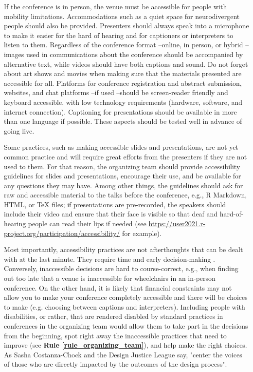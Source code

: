 \documentclass[10pt,letterpaper]{article}
\begin{document}
If the conference is in person, the venue must be accessible for people with mobility limitations. 
Accommodations such as a quiet space for neurodivergent people should also be provided.
Presenters should always speak into a microphone to make it easier for the hard of hearing and for captioners or interpreters to listen to them. 
Regardless of the conference format --online, in person, or hybrid --images used in communications about the conference should be accompanied by alternative text, while videos should have both captions and sound. Do not forget about art shows and movies when making sure that the materials presented are accessible for all. 
Platforms for conference registration and abstract submission, websites, and chat platforms --if used --should be screen-reader friendly and keyboard accessible, with low technology requirements (hardware, software, and internet connection). 
Captioning for presentations should be available in more than one language if possible.
These aspects should be tested well in advance of going live.  

Some practices, such as making accessible slides and presentations, are not yet common practice and will require great efforts from the presenters if they are not used to them. 
For that reason, the organizing team should provide accessibility guidelines for slides and presentations, encourage their use, and be available for any questions they may have.  
Among other things, the guidelines should ask for raw and accessible material to the talks before the conference, e.g., R Markdown, HTML, or \TeX{} files; if presentations are pre-recorded, the speakers should include their video and ensure that their face is visible so that deaf and hard-of-hearing people can read their lips if needed (see \url{https://user2021.r-project.org/participation/accessibility/} for example). 

Most importantly, accessibility practices are not afterthoughts that can be dealt with at the last minute. 
They require time and early decision-making \cite{irishIncreasingParticipationUsing2020}. 
Conversely, inaccessible decisions are hard to course-correct, e.g., when finding out too late that a venue is inaccessible for wheelchairs in an in-person conference. 
On the other hand, it is likely that financial constraints may not allow you to make your conference completely accessible and there will be choices to make (e.g. choosing between captions and interpreters). 
Including people with disabilities, or rather, that are rendered disabled by standard practices in conferences in the organizing team would allow them to take part in the decisions from the beginning, spot right away the inaccessible practices that need to improve (see \textbf{Rule \ref{rule_organizing_team}}), and help make the right choices. As Sasha Costanza-Chock and the Design Justice League say, "center the voices of those who are directly impacted by the outcomes of the design process".  %
\end{document}
